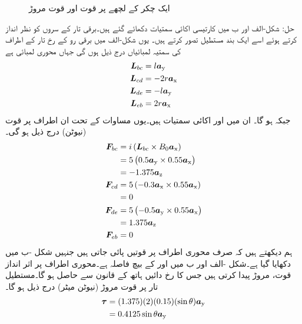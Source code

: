 \begin{figure}
%
\caption{ایک چکر کے لچھے پر قوت اور قوت مروڑ}
\label{شکل_تبادلہ_طاقت_لچھے_پر_قوت_اور_مروڑ}
\end{figure}
%
حل:\quad
شکل-الف اور ب میں کارتیسی اکائی سمتیات دکھائے  گئے ہیں۔برقی تار کے سروں کو نظر انداز کرتے ہوئے  اسے ایک بند مستطیل تصور کرتے ہیں۔ یوں   شکل-الف میں  برقی رو کے رخ تار کے اطراف کی سمتیہ لمبائیاں  درج ذیل ہوں گی جہاں  محوری لمبائی ہے
\begin{align*}
{\ensuremath{{\boldsymbol{L}}}}_{bc}&=l {\boldsymbol{a}}_{\textup{y}}\\
{{\boldsymbol{L}}}_{cd}&=-2 r {\boldsymbol{a}}_{\textup{x}}\\
{{\boldsymbol{L}}}_{de}&=-l {\boldsymbol{a}}_{\textup{y}}\\
{{\boldsymbol{L}}}_{eb}&=2 r {\boldsymbol{a}}_{\textup{x}}
\end{align*}
 جبکہ  ہو گا۔ ان میں  اور  اکائی سمتیات ہیں۔یوں مساوات   کے تحت ان اطراف پر قوت (نیوٹن) درج ذیل ہو گی۔
\begin{align*}
{\ensuremath{{\boldsymbol{F}}}}_{bc}&= i \left({{\boldsymbol{L}}}_{bc} \times B_0 {\boldsymbol{a}}_{\textup{x}} \right)\\
&=5 \left(0.5 {\boldsymbol{a}}_{\textup{y}} \times 0.55 {\boldsymbol{a}}_{\textup{x}} \right)\\
&=-1.375 {\boldsymbol{a}}_{\textup{z}}\\
{{\boldsymbol{F}}}_{cd}&= 5\left(-0.3{\boldsymbol{a}}_{\textup{x}} \times 0.55 {\boldsymbol{a}}_{\textup{x}} \right)\\
&=0\\
{{\boldsymbol{F}}}_{de}&= 5 \left(-0.5{\boldsymbol{a}}_{\textup{y}} \times 0.55 {\boldsymbol{a}}_{\textup{x}} \right)\\
&=1.375 {\boldsymbol{a}}_{\textup{z}}\\
{{\boldsymbol{F}}}_{eb}&= 0
\end{align*}
ہم دیکھتے ہیں کہ  صرف محوری  اطراف پر قوتیں  پائی جاتی  ہیں جنہیں شکل -ب  میں دکھایا گیا ہے۔شکل -الف اور ب میں  اور  کے بیچ فاصلہ  ہے۔محوری اطراف پر اثر انداز قوت، مروڑ پیدا کرتی ہیں جس کا رخ  دائیں ہاتھ کے قانون سے حاصل ہو گا۔مستطیل تار پر قوت مروڑ (نیوٹن میٹر)  درج ذیل ہو گا۔
\begin{align*}
{\ensuremath{{\boldsymbol{\tau}}}}&=(1.375)( 2)( 0.15)( \sin \theta) {\boldsymbol{a}}_{\textup{y}}\\
&=0.4125 \sin \theta {\boldsymbol{a}}_{\textup{y}}
\end{align*}
%

